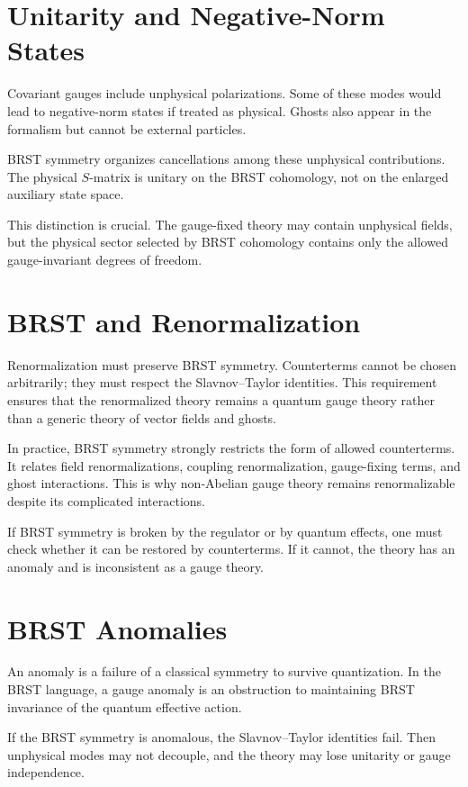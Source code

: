 \section{Unitarity and Negative-Norm States}

Covariant gauges include unphysical polarizations. Some of these modes would
lead to negative-norm states if treated as physical. Ghosts also appear in the
formalism but cannot be external particles.

BRST symmetry organizes cancellations among these unphysical contributions. The
physical \(S\)-matrix is unitary on the BRST cohomology, not on the enlarged
auxiliary state space.

This distinction is crucial. The gauge-fixed theory may contain unphysical
fields, but the physical sector selected by BRST cohomology contains only the
allowed gauge-invariant degrees of freedom.

\section{BRST and Renormalization}

Renormalization must preserve BRST symmetry. Counterterms cannot be chosen
arbitrarily; they must respect the Slavnov--Taylor identities. This requirement
ensures that the renormalized theory remains a quantum gauge theory rather than
a generic theory of vector fields and ghosts.

In practice, BRST symmetry strongly restricts the form of allowed counterterms.
It relates field renormalizations, coupling renormalization, gauge-fixing terms,
and ghost interactions. This is why non-Abelian gauge theory remains
renormalizable despite its complicated interactions.

If BRST symmetry is broken by the regulator or by quantum effects, one must check
whether it can be restored by counterterms. If it cannot, the theory has an
anomaly and is inconsistent as a gauge theory.

\section{BRST Anomalies}

An anomaly is a failure of a classical symmetry to survive quantization. In the
BRST language, a gauge anomaly is an obstruction to maintaining BRST invariance
of the quantum effective action.

If the BRST symmetry is anomalous, the Slavnov--Taylor identities fail. Then
unphysical modes may not decouple, and the theory may lose unitarity or gauge
independence.

